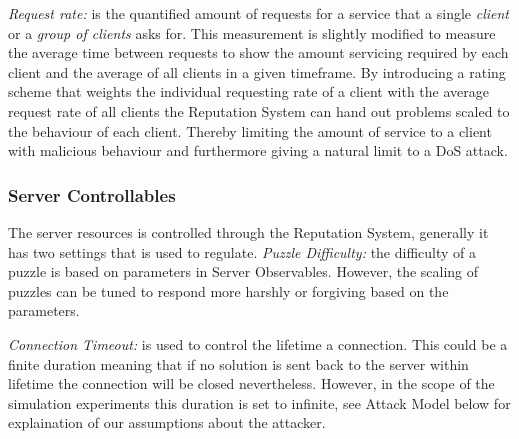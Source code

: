 \emph{Request rate:} is the quantified amount of requests for a service that a single \emph{client} or a \emph{group of clients} asks for. This measurement is slightly modified to measure the average time between requests to show the amount servicing required by each client and the average of all clients in a given timeframe. By introducing a rating scheme that weights the individual requesting rate of a client with the average request rate of all clients the Reputation System can hand out problems scaled to the behaviour of each client. Thereby limiting the amount of service to a client with malicious behaviour and furthermore giving a natural limit to a DoS attack.


\subsubsection{Server Controllables}
The server resources is controlled through the Reputation System, generally it has two settings that is used to regulate.
\emph{Puzzle Difficulty:} the difficulty of a puzzle is based on parameters in Server Observables. However, the scaling of puzzles can be tuned to respond more harshly or forgiving based on the parameters.

\emph{Connection Timeout:} is used to control the lifetime a connection. This could be a finite duration meaning that if no solution is sent back to the server within lifetime the connection will be closed nevertheless.
However, in the scope of the simulation experiments this duration is set to infinite, see Attack Model below for explaination of our assumptions about the attacker. 
